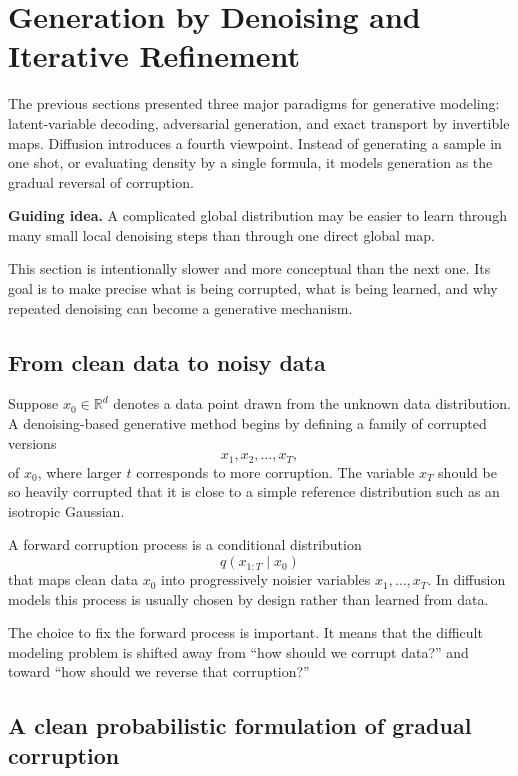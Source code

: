 \section{Generation by Denoising and Iterative Refinement}

The previous sections presented three major paradigms for generative modeling:
latent-variable decoding, adversarial generation, and exact transport by invertible maps.
Diffusion introduces a fourth viewpoint.
Instead of generating a sample in one shot, or evaluating density by a single formula, it models generation as the gradual reversal of corruption.

\medskip

\noindent
\textbf{Guiding idea.}
A complicated global distribution may be easier to learn through many small local denoising steps than through one direct global map.

\medskip

This section is intentionally slower and more conceptual than the next one.
Its goal is to make precise what is being corrupted, what is being learned, and why repeated denoising can become a generative mechanism.

\subsection*{From clean data to noisy data}

Suppose $x_0\in \mathbb{R}^d$ denotes a data point drawn from the unknown data distribution.
A denoising-based generative method begins by defining a family of corrupted versions
\[
x_1,x_2,\dots,x_T,
\]
of $x_0$, where larger $t$ corresponds to more corruption.
The variable $x_T$ should be so heavily corrupted that it is close to a simple reference distribution such as an isotropic Gaussian.

\begin{definition}
A forward corruption process is a conditional distribution
\[
q(x_{1:T}\mid x_0)
\]
that maps clean data $x_0$ into progressively noisier variables $x_1,\dots,x_T$.
In diffusion models this process is usually chosen by design rather than learned from data.
\end{definition}

The choice to fix the forward process is important.
It means that the difficult modeling problem is shifted away from ``how should we corrupt data?'' and toward ``how should we reverse that corruption?''

\subsection*{A clean probabilistic formulation of gradual corruption}

